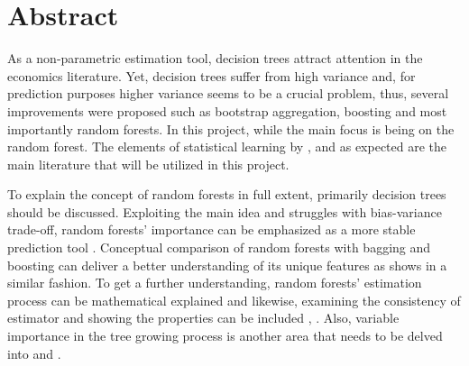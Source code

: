 \section{Abstract}
\thispagestyle{empty}
As a non-parametric estimation tool, decision trees attract attention in the economics literature. 
Yet, decision trees suffer from high variance and, 
for prediction purposes higher variance seems to be a crucial problem, thus, 
several improvements were proposed such as bootstrap aggregation, boosting and most importantly random forests. 
In this project, while the main focus is being on the random forest.
The elements of statistical learning by \cite{friedman2001elements} \cite{varian2014big} \cite{maimon2005data},
\cite{louppe2014understanding} and as expected \cite{breiman2001random} are the main literature 
that will be utilized in this project.

To explain the concept of random forests in full extent, primarily decision trees should be discussed. 
Exploiting the main idea and struggles with bias-variance trade-off, 
random forests' importance can be emphasized as a more stable prediction tool \cite{maimon2005data}. 
Conceptual comparison of random forests with bagging and boosting can deliver a better understanding of 
its unique features as \cite{lee2019bootstrap} shows in a similar fashion. To get a further understanding, 
random forests’ estimation process can be mathematical explained \cite{biau2012analysis} and likewise, 
examining the consistency of estimator and showing the properties can be included \cite{breiman2004consistency}, 
\cite{denil2014narrowing}. Also, variable importance in the tree growing process is another area that needs to be 
delved into \cite{ishwaran2007variable} and \cite{louppe2013understanding}.
